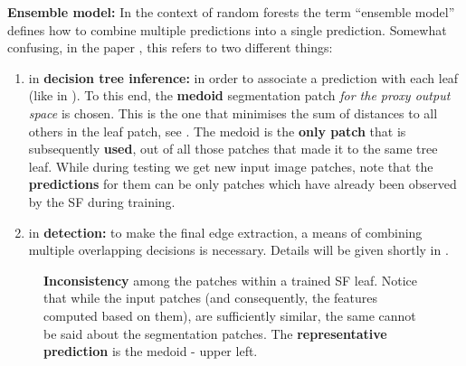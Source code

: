 \textbf{Ensemble model:} In the context of random forests the term ``ensemble model'' defines how to combine multiple predictions into a single prediction. Somewhat confusing, in the paper \cite{DollarICCV13edges}, this refers to two different things:
\begin{enumerate}
 \item{in {\bf decision tree inference:}} in order to associate a prediction with each leaf (like in ). 
 To this end, the {\bf medoid} segmentation patch \textit{for the proxy output space} is chosen. This is the one that minimises the sum of distances to all others in the leaf patch, see . The medoid is the {\bf only patch} that is subsequently {\bf used}, out of all those patches that made it to the same tree leaf. 
 While during testing we get new input image patches, note that the {\bf predictions} for them can be only patches which have already been observed by the SF during training. %
 \item{in {\bf detection:}} to make the final edge extraction, a means of combining multiple overlapping decisions is necessary. Details will be given shortly in .
\end{enumerate}

\begin{figure}[ht!]
\centering
\caption[Inconsistency among the patches within a trained SF leaf]{{\bf Inconsistency} among the patches within a trained SF leaf. Notice that while the input patches (and consequently, the features computed based on them), are sufficiently similar, the same cannot be said about the segmentation patches. The {\bf representative prediction} is the medoid - upper left.}
\label{fig:srf-leaf}
\end{figure}

